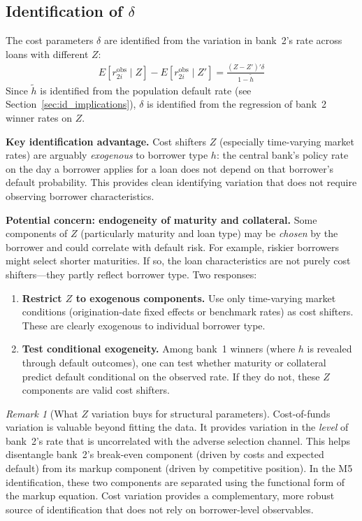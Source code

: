\documentclass[12pt]{article}
\theoremstyle{plain}
\theoremstyle{plain}
\theoremstyle{definition}  %
\theoremstyle{remark}  %
\newtheorem{remark}[thm]{Remark}  %
\begin{document}
\subsection{Identification of $\delta$}\label{sec:id_delta}

The cost parameters $\delta$ are identified from the variation in bank~2's rate across loans with different $Z$:
\begin{align}\label{eq:delta_id}
    E[r_{2i}^{\text{obs}} \mid Z] - E[r_{2i}^{\text{obs}} \mid Z'] = \frac{(Z - Z')'\delta}{1 - \tilde{h}}
\end{align}
Since $\tilde{h}$ is identified from the population default rate (see Section~\ref{sec:id_implications}), $\delta$ is identified from the regression of bank~2 winner rates on $Z$.

\medskip\noindent
\textbf{Key identification advantage.} Cost shifters $Z$ (especially time-varying market rates) are arguably \emph{exogenous} to borrower type $h$: the central bank's policy rate on the day a borrower applies for a loan does not depend on that borrower's default probability. This provides clean identifying variation that does not require observing borrower characteristics.

\medskip\noindent
\textbf{Potential concern: endogeneity of maturity and collateral.} Some components of $Z$ (particularly maturity and loan type) may be \emph{chosen} by the borrower and could correlate with default risk. For example, riskier borrowers might select shorter maturities. If so, the loan characteristics are not purely cost shifters---they partly reflect borrower type. Two responses:
\begin{enumerate}
    \item \textbf{Restrict $Z$ to exogenous components.} Use only time-varying market conditions (origination-date fixed effects or benchmark rates) as cost shifters. These are clearly exogenous to individual borrower type.
    \item \textbf{Test conditional exogeneity.} Among bank~1 winners (where $h$ is revealed through default outcomes), one can test whether maturity or collateral predict default conditional on the observed rate. If they do not, these $Z$ components are valid cost shifters.
\end{enumerate}

\begin{remark}[What $Z$ variation buys for structural parameters]
Cost-of-funds variation is valuable beyond fitting the data. It provides variation in the \emph{level} of bank~2's rate that is uncorrelated with the adverse selection channel. This helps disentangle bank~2's break-even component (driven by costs and expected default) from its markup component (driven by competitive position). In the M5 identification, these two components are separated using the functional form of the markup equation. Cost variation provides a complementary, more robust source of identification that does not rely on borrower-level observables.
\end{remark}
\end{document}
